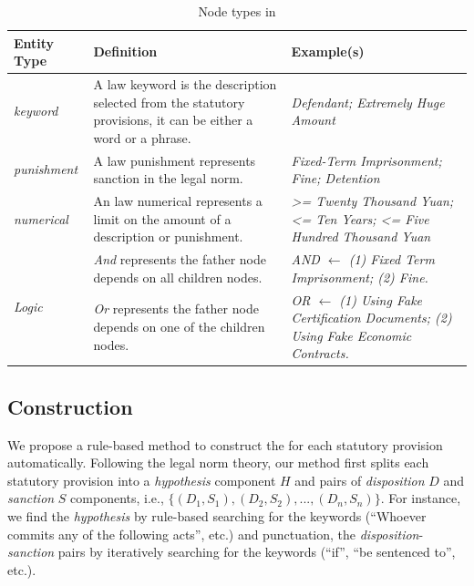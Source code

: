 \begin{table}
    \centering
    \scriptsize
    \caption{Node types in \lawgraph{}}
    \begin{tabular}{p{}p{}p{}}
    \toprule
        Entity Type & Definition & Example(s)  \\
        \hline
        \textit{keyword} & A law keyword is the description selected from the statutory provisions, it can be either a word or a phrase. & \textit{Defendant; Extremely Huge Amount}\\
        \hline
        \textit{punishment} & A law punishment represents sanction in the legal norm. & \textit{Fixed-Term Imprisonment; Fine; Detention}\\
        \hline
        \textit{numerical} & An law numerical represents a limit on the amount of a description or punishment. & \textit{>= Twenty Thousand Yuan; <= Ten Years; <= Five Hundred Thousand Yuan}\\
        \hline
        \multirow{2}{*}{\textit{Logic}} & \textit{And} represents the father node depends on all children nodes.  & \textit{AND ${\longleftarrow}$ (1) Fixed Term Imprisonment; (2) Fine.} \\
        \cline{2-3}
        & \textit{Or} represents the father node depends on one of the children nodes. & 
        \textit{OR {${\longleftarrow}$} (1) Using Fake Certification Documents; (2) Using Fake Economic Contracts.}\\
        \bottomrule
    \end{tabular}
    \label{tab:L_node_t}
        \vspace{-1em}

\end{table}




\subsection{\lawgraph{} Construction}

We propose a rule-based method to construct the \lawgraph{} for each statutory provision automatically. Following the legal norm theory, our method first splits each statutory provision into a \textit{hypothesis} component $H$ and pairs of \textit{disposition} $D$ and \textit{sanction} $S$ components, i.e., $\{(D_1, S_1), (D_2, S_2), ..., (D_n, S_n)\}$. For instance, we find the \textit{hypothesis} by rule-based searching for the keywords (``Whoever commits any of the following acts'', etc.) and punctuation, the \textit{disposition}-\textit{sanction} pairs by iteratively searching for the keywords (``if'', ``be sentenced to'', etc.).

